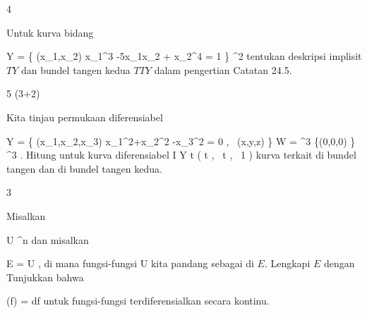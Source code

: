 {4}
{

Untuk kurva bidang

\mavergleichskettedisp
{\vergleichskette
{ Y
}
{ =} { \left\{ (x_1,x_2)  \mid   x_1^3 -5x_1x_2 + x_2^4 = 1         \right\}
}
{ \subset} { \R^2
}
{ } {
}
{ } {
}
}
{}{}{}
tentukan deskripsi implisit
$TY$ dan bundel tangen kedua $TTY$ dalam pengertian
Catatan 24.5.

}
{} {}

{5 (3+2)}
{

Kita tinjau permukaan diferensiabel

\mavergleichskettedisp
{\vergleichskette
{ Y
}
{ =} { \left\{ (x_1,x_2,x_3)  \mid   x_1^2+x_2^2 -x_3^2 = 0  , \, (x,y,z)        \right\}
}
{ \subseteq} { W
}
{ =} { \R^3 \setminus \{(0,0,0) \}
}
{ \subset} { \R^3
}
}
{}{}{.}
 {Hitung untuk kurva diferensiabel
\maabbeledisp {} { I } { Y
} { t } { \left(  \cos  t   , \,   \sin  t  , \,   1                 \right)
} {}
kurva terkait di bundel tangen dan di bundel tangen kedua.
}

}
{} {}

{3}
{

Misalkan

\mavergleichskette
{\vergleichskette
{ U
}
{ \subseteq }{ \R^n
}
{  }{
}
{    }{
}
{   }{
}
}
{}{}{}
dan misalkan

\mavergleichskette
{\vergleichskette
{ E
}
{ = }{ U \times \R
}
{  }{
}
{    }{
}
{   }{
}
}
{}{}{,}
di mana fungsi-fungsi
 { U } {\R
} {}
kita pandang sebagai
di $E$. Lengkapi $E$ dengan
 Tunjukkan bahwa

\mavergleichskette
{\vergleichskette
{ \nabla (f)
}
{ = }{ df
}
{  }{
}
{    }{
}
{   }{
}
}
{}{}{}
untuk fungsi-fungsi terdiferensialkan secara kontinu.

}
{} {}
